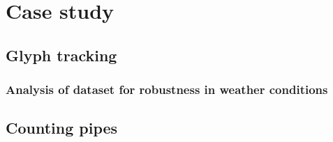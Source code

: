 \chapter{Case study}
\section{Glyph tracking}
\subsection{Analysis of dataset for robustness in weather conditions}
\section{Counting pipes}
